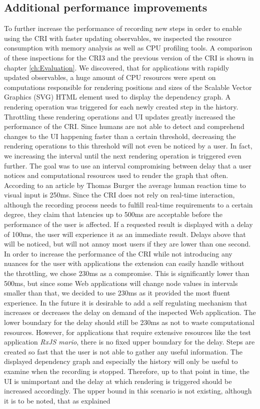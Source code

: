 \subsection{Additional performance improvements}
\label{sec:additonPerformance} %
To further increase the performance of recording new steps in order to enable using the CRI with faster updating observables, we inspected the resource consumption with memory analysis as well as CPU profiling tools. A comparison of these inspections for the CRI3 and the previous version of the CRI is shown in chapter \ref{ch:Evaluation}. We discovered, that for applications with rapidly updated observables, a huge amount of CPU resources were spent on computations responsible for rendering positions and sizes of the Scalable Vector Graphics (SVG) HTML element used to display the dependency graph. A rendering operation was triggered for each newly created step in the history. Throttling these rendering operations and UI updates greatly increased the performance of the CRI. Since humans are not able to detect and comprehend changes to the UI happening faster than a certain threshold, decreasing the rendering operations to this threshold will not even be noticed by a user. In fact, we increasing the interval until the next rendering operation is triggered even further. The goal was to use an interval compromising between delay that a user notices and computational resources used to render the graph that often. According to an article by Thomas Burger \cite{Perception} the average human reaction time to visual input is 250ms. Since the CRI does not rely on real-time interaction, although the recording process needs to fulfill real-time requirements to a certain degree, they claim that latencies up to 500ms are acceptable before the performance of the user is affected. If a requested result is displayed with a delay of 100ms, the user will experience it as an immediate result. Delays above that will be noticed, but will not annoy most users if they are lower than one second. In order to increase the performance of the CRI while not introducing any nuances for the user with applications the extension can easily handle without the throttling, we chose 230ms as a compromise. This is significantly lower than 500ms, but since some Web applications will change node values in intervals smaller than that, we decided to use 230ms as it provided the most fluent experience. In the future it is desirable to add a self regulating mechanism that increases or decreases the delay on demand of the inspected Web application. The lower boundary for the delay should still be 230ms as not to waste computational resources. However, for applications that require extensive resources like the test application \emph{RxJS mario}, there is no fixed upper boundary for the delay. Steps are created so fast that the user is not able to gather any useful information. The displayed dependency graph and especially the history will only be useful to examine when the recording is stopped. Therefore, up to that point in time, the UI is unimportant and the delay at which rendering is triggered should be increased accordingly. The upper bound in this scenario is not existing, although it is to be noted, that as explained 